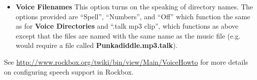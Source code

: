 \begin{itemize}
  \item \textbf{Voice Filenames}
    This option turns on the speaking of directory names.  The options provided are ``Spell'', ``Numbers'', and ``Off'' which function the same as for \textbf{Voice Directories} and ``.talk mp3 clip'', which functions as above except that the files are named with the same name as the music file (e.g.  would require a file called \textbf{Punkadiddle.mp3.talk}).
\end{itemize}
See \url{http://www.rockbox.org/twiki/bin/view/Main/VoiceHowto} for more details on configuring speech support in Rockbox.

